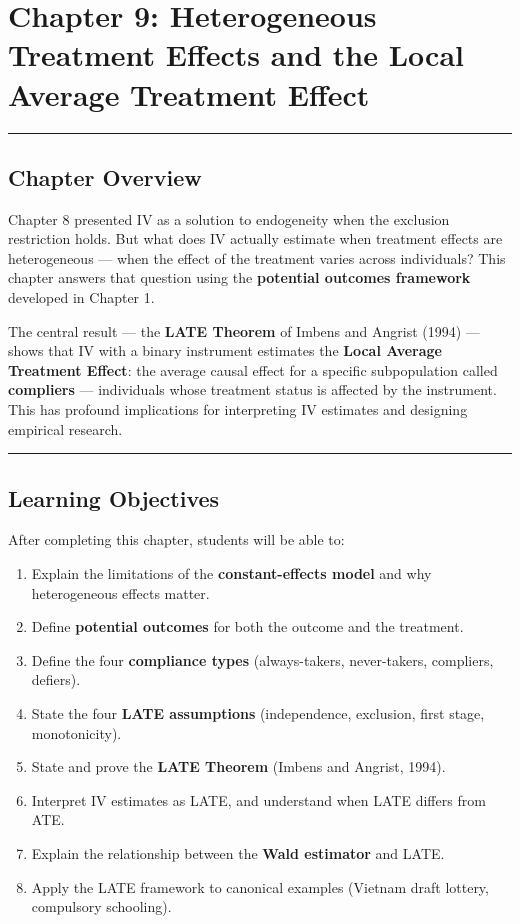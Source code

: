 \chapter{Chapter 9: Heterogeneous Treatment Effects and the Local Average Treatment Effect}

\medskip\hrule\medskip

\section{Chapter Overview}

Chapter 8 presented IV as a solution to endogeneity when the exclusion restriction holds. But what does IV actually estimate when treatment effects are heterogeneous --- when the effect of the treatment varies across individuals? This chapter answers that question using the \textbf{potential outcomes framework} developed in Chapter 1.

The central result --- the \textbf{LATE Theorem} of Imbens and Angrist (1994) --- shows that IV with a binary instrument estimates the \textbf{Local Average Treatment Effect}: the average causal effect for a specific subpopulation called \textbf{compliers} --- individuals whose treatment status is affected by the instrument. This has profound implications for interpreting IV estimates and designing empirical research.

\medskip\hrule\medskip

\section{Learning Objectives}

After completing this chapter, students will be able to:

\begin{enumerate}
\item Explain the limitations of the \textbf{constant-effects model} and why heterogeneous effects matter.
\item Define \textbf{potential outcomes} for both the outcome and the treatment.
\item Define the four \textbf{compliance types} (always-takers, never-takers, compliers, defiers).
\item State the four \textbf{LATE assumptions} (independence, exclusion, first stage, monotonicity).
\item State and prove the \textbf{LATE Theorem} (Imbens and Angrist, 1994).
\item Interpret IV estimates as LATE, and understand when LATE differs from ATE.
\item Explain the relationship between the \textbf{Wald estimator} and LATE.
\item Apply the LATE framework to canonical examples (Vietnam draft lottery, compulsory schooling).
\end{enumerate}

